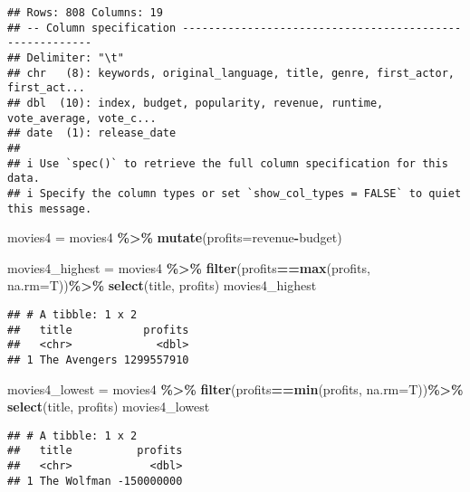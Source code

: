 \documentclass[
]{article}
\newenvironment{Shaded}{\begin{snugshade}}{\end{snugshade}}
\newcommand{\AttributeTok}[1]{\textcolor[rgb]{0.13,0.29,0.53}{#1}}
\newcommand{\FunctionTok}[1]{\textcolor[rgb]{0.13,0.29,0.53}{\textbf{#1}}}
\newcommand{\NormalTok}[1]{#1}
\newcommand{\OtherTok}[1]{\textcolor[rgb]{0.56,0.35,0.01}{#1}}
\newcommand{\SpecialCharTok}[1]{\textcolor[rgb]{0.81,0.36,0.00}{\textbf{#1}}}
\begin{document}
\begin{verbatim}
## Rows: 808 Columns: 19
## -- Column specification --------------------------------------------------------
## Delimiter: "\t"
## chr   (8): keywords, original_language, title, genre, first_actor, first_act...
## dbl  (10): index, budget, popularity, revenue, runtime, vote_average, vote_c...
## date  (1): release_date
## 
## i Use `spec()` to retrieve the full column specification for this data.
## i Specify the column types or set `show_col_types = FALSE` to quiet this message.
\end{verbatim}

\begin{Shaded}
\begin{Highlighting}[]
\NormalTok{movies4 }\OtherTok{=}\NormalTok{ movies4 }\SpecialCharTok{\%\textgreater{}\%}
  \FunctionTok{mutate}\NormalTok{(}\AttributeTok{profits=}\NormalTok{revenue}\SpecialCharTok{{-}}\NormalTok{budget)}

\NormalTok{movies4\_highest }\OtherTok{=}\NormalTok{ movies4 }\SpecialCharTok{\%\textgreater{}\%}
  \FunctionTok{filter}\NormalTok{(profits}\SpecialCharTok{==}\FunctionTok{max}\NormalTok{(profits, }\AttributeTok{na.rm=}\NormalTok{T))}\SpecialCharTok{\%\textgreater{}\%}
  \FunctionTok{select}\NormalTok{(title, profits)}
\NormalTok{movies4\_highest}
\end{Highlighting}
\end{Shaded}

\begin{verbatim}
## # A tibble: 1 x 2
##   title           profits
##   <chr>             <dbl>
## 1 The Avengers 1299557910
\end{verbatim}

\begin{Shaded}
\begin{Highlighting}[]
\NormalTok{movies4\_lowest }\OtherTok{=}\NormalTok{ movies4 }\SpecialCharTok{\%\textgreater{}\%}
  \FunctionTok{filter}\NormalTok{(profits}\SpecialCharTok{==}\FunctionTok{min}\NormalTok{(profits, }\AttributeTok{na.rm=}\NormalTok{T))}\SpecialCharTok{\%\textgreater{}\%}
  \FunctionTok{select}\NormalTok{(title, profits)}
\NormalTok{movies4\_lowest}
\end{Highlighting}
\end{Shaded}

\begin{verbatim}
## # A tibble: 1 x 2
##   title          profits
##   <chr>            <dbl>
## 1 The Wolfman -150000000
\end{verbatim}
\end{document}
